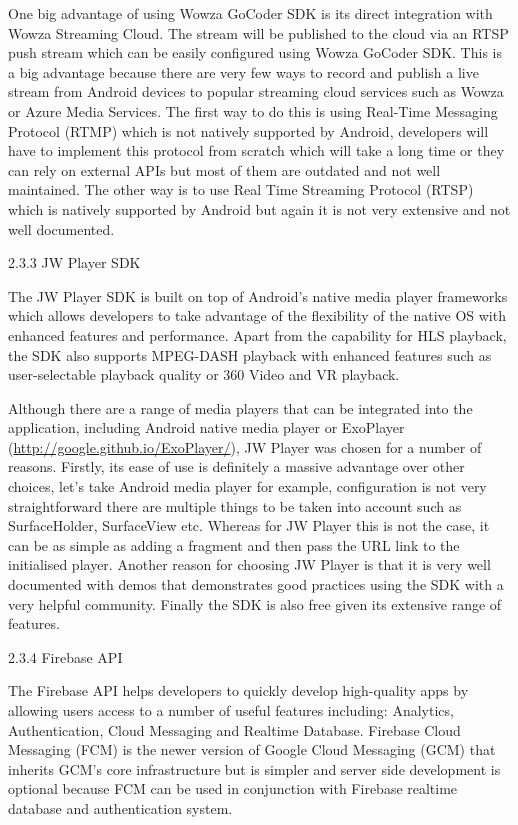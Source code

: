 \documentclass{article}
\begin{document}
\begin{flushleft}
One big advantage of using Wowza GoCoder SDK is its direct integration with Wowza Streaming Cloud. The stream will be published to the cloud via an RTSP push stream which can be easily configured using Wowza GoCoder SDK. This is a big advantage because there are very few ways to record and publish a live stream from Android devices to popular streaming cloud services such as Wowza or Azure Media Services. The first way to do this is using Real-Time Messaging Protocol (RTMP) which is not natively supported by Android, developers will have to implement this protocol from scratch which will take a long time or they can rely on external APIs but most of them are outdated and not well maintained. The other way is to use Real Time Streaming Protocol (RTSP) which is natively supported by Android but again it is not very extensive and not well documented.\par
{\large 2.3.3 JW Player SDK}\par
The JW Player SDK is built on top of Android's native media player frameworks which allows developers to take advantage of the flexibility of the native OS with enhanced features and performance. Apart from the capability for HLS playback, the SDK also supports MPEG-DASH playback with enhanced features such as user-selectable playback quality or 360 Video and VR playback.\par
Although there are a range of media players that can be integrated into the application, including Android native media player or ExoPlayer (\url {http://google.github.io/ExoPlayer/}), JW Player was chosen for a number of reasons. Firstly, its ease of use is definitely a massive advantage over other choices, let's take Android media player for example, configuration is not very straightforward there are multiple things to be taken into account such as SurfaceHolder, SurfaceView etc. Whereas for JW Player this is not the case, it can be as simple as adding a fragment and then pass the URL link to the initialised player. Another reason for choosing JW Player is that it is very well documented with demos that demonstrates good practices using the SDK with a very helpful community. Finally the SDK is also free given its extensive range of features.\par
{\large 2.3.4 Firebase API}\par
The Firebase API helps developers to quickly develop high-quality apps by allowing users access to a number of useful features including: Analytics, Authentication, Cloud Messaging and Realtime Database. Firebase Cloud Messaging (FCM) is the newer version of Google Cloud Messaging (GCM) that inherits GCM's core infrastructure but is simpler and server side development is optional because FCM can be used in conjunction with Firebase realtime database and authentication system.\par

\end{flushleft}
\end{document}
